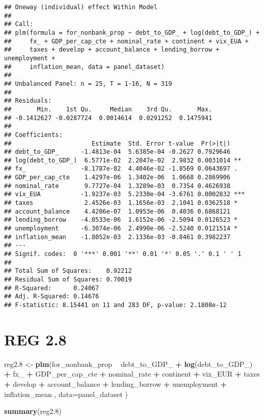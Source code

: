 \documentclass[]{article}
\newenvironment{Shaded}{\begin{snugshade}}{\end{snugshade}}
\newcommand{\KeywordTok}[1]{\textcolor[rgb]{0.13,0.29,0.53}{\textbf{#1}}}
\newcommand{\DataTypeTok}[1]{\textcolor[rgb]{0.13,0.29,0.53}{#1}}
\newcommand{\DecValTok}[1]{\textcolor[rgb]{0.00,0.00,0.81}{#1}}
\newcommand{\StringTok}[1]{\textcolor[rgb]{0.31,0.60,0.02}{#1}}
\newcommand{\OperatorTok}[1]{\textcolor[rgb]{0.81,0.36,0.00}{\textbf{#1}}}
\newcommand{\NormalTok}[1]{#1}
\begin{document}
\begin{verbatim}
## Oneway (individual) effect Within Model
## 
## Call:
## plm(formula = for_nonbank_prop ~ debt_to_GDP_ + log(debt_to_GDP_) + 
##     fx_ + GDP_per_cap_cte + nominal_rate + continent + vix_EUA + 
##     taxes + develop + account_balance + lending_borrow + unemployment + 
##     inflation_mean, data = panel_dataset)
## 
## Unbalanced Panel: n = 25, T = 1-16, N = 319
## 
## Residuals:
##       Min.    1st Qu.     Median    3rd Qu.       Max. 
## -0.1412627 -0.0287724  0.0014614  0.0291252  0.1475941 
## 
## Coefficients:
##                      Estimate  Std. Error t-value  Pr(>|t|)    
## debt_to_GDP_      -1.4813e-04  5.6385e-04 -0.2627 0.7929646    
## log(debt_to_GDP_)  6.5771e-02  2.2047e-02  2.9832 0.0031014 ** 
## fx_               -8.1787e-02  4.4046e-02 -1.8569 0.0643697 .  
## GDP_per_cap_cte    1.4297e-06  1.3402e-06  1.0668 0.2869906    
## nominal_rate       9.7727e-04  1.3289e-03  0.7354 0.4626938    
## vix_EUA           -1.9237e-03  5.2330e-04 -3.6761 0.0002832 ***
## taxes              2.4526e-03  1.1656e-03  2.1041 0.0362518 *  
## account_balance    4.4206e-07  1.0953e-06  0.4036 0.6868121    
## lending_borrow    -4.0533e-06  1.6152e-06 -2.5094 0.0126523 *  
## unemployment      -6.3074e-06  2.4990e-06 -2.5240 0.0121514 *  
## inflation_mean    -1.8052e-03  2.1336e-03 -0.8461 0.3982237    
## ---
## Signif. codes:  0 '***' 0.001 '**' 0.01 '*' 0.05 '.' 0.1 ' ' 1
## 
## Total Sum of Squares:    0.92212
## Residual Sum of Squares: 0.70019
## R-Squared:      0.24067
## Adj. R-Squared: 0.14676
## F-statistic: 8.15441 on 11 and 283 DF, p-value: 2.1808e-12
\end{verbatim}

\section{REG 2.8}\label{reg-2.8}

\begin{Shaded}
\begin{Highlighting}[]
\NormalTok{reg2.}\DecValTok{8}\NormalTok{ <-}\StringTok{ }\KeywordTok{plm}\NormalTok{(for_nonbank_prop }\OperatorTok{~}\StringTok{  }\NormalTok{debt_to_GDP_ }\OperatorTok{+}\StringTok{ }\KeywordTok{log}\NormalTok{(debt_to_GDP_) }\OperatorTok{+}\StringTok{ }\NormalTok{fx_ }\OperatorTok{+}\StringTok{ }\NormalTok{GDP_per_cap_cte }\OperatorTok{+}\StringTok{  }\NormalTok{nominal_rate }\OperatorTok{+}\StringTok{ }\NormalTok{continent }\OperatorTok{+}\StringTok{  }\NormalTok{vix_EUR }\OperatorTok{+}\StringTok{ }\NormalTok{taxes }\OperatorTok{+}\StringTok{ }\NormalTok{develop }\OperatorTok{+}\StringTok{ }\NormalTok{account_balance }\OperatorTok{+}\StringTok{ }\NormalTok{lending_borrow }\OperatorTok{+}\StringTok{ }\NormalTok{unemployment }\OperatorTok{+}\StringTok{ }\NormalTok{inflation_mean , }\DataTypeTok{data=}\NormalTok{panel_dataset  )}

\KeywordTok{summary}\NormalTok{(reg2.}\DecValTok{8}\NormalTok{)}
\end{Highlighting}
\end{Shaded}
\end{document}
